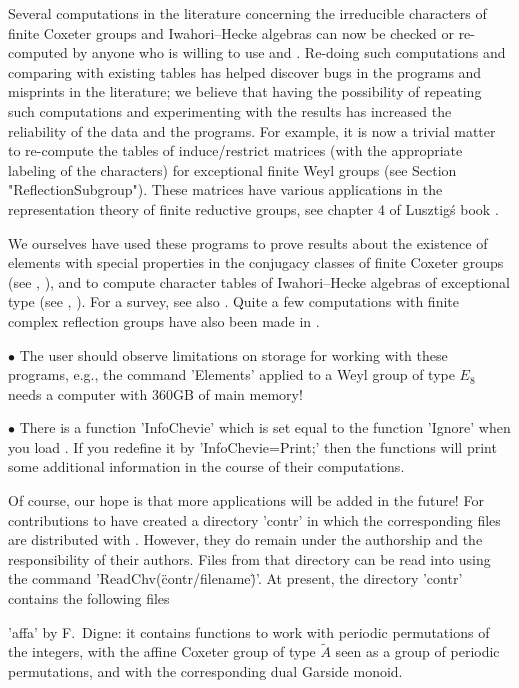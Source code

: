 Several   computations  in   the  literature   concerning  the  irreducible
characters  of finite Coxeter groups and Iwahori--Hecke algebras can now be
checked  or  re-computed  by  anyone  who  is  willing  to  use  {\GAP} and
\CHEVIE.  Re-doing such  computations and  comparing with existing tables
has  helped discover bugs in the  programs and misprints in the literature;
we  believe that having the possibility  of repeating such computations and
experimenting  with the results  has increased the  reliability of the data
and the programs. For example, it is now a trivial matter to re-compute the
tables  of induce/restrict matrices  (with the appropriate  labeling of the
characters) for exceptional finite Weyl groups (see Section
"ReflectionSubgroup").  These  matrices  have  various  applications in the
representation  theory  of  finite  reductive  groups,  see  chapter  4  of
Lusztig\'s book \cite{Lus85}.

We  ourselves have used these programs to prove results about the existence
of  elements with  special properties  in the  conjugacy classes  of finite
Coxeter  groups (see  \cite{GP93}, \cite{GM97}),  and to  compute character
tables  of Iwahori--Hecke  algebras of  exceptional type (see \cite{Gec94},
\cite{GM97}). For a survey, see also \cite{Chv96}. Quite a few computations
with finite complex reflection groups have also been made in \CHEVIE.

$\bullet$  The user should observe limitations  on storage for working with
these  programs, e.g.,  the command  'Elements' applied  to a Weyl group of
type $E_8$ needs a computer with 360GB of main memory!

$\bullet$ There is a function 'InfoChevie' which is set equal to the {\GAP}
function   'Ignore'  when  you   load  \CHEVIE.  If   you  redefine  it  by
'InfoChevie\:=Print;'   then  the  {\CHEVIE}   functions  will  print  some
additional information in the course of their computations.

Of  course, our hope is that more applications will be added in the future!
For  contributions to {\CHEVIE}  have created a  directory 'contr' in which
the  corresponding  files  are  distributed  with \CHEVIE. However, they do
remain  under the authorship and the responsibility of their authors. Files
from   that  directory   can  be   read  into   {\GAP}  using  the  command
'ReadChv(\"contr/filename\")'.  At present, the  directory 'contr' contains
the following files\:

'affa'   by  F.~Digne:  it   contains  functions  to   work  with  periodic
permutations of the integers, with the affine Coxeter group of type $\tilde
A$  seen as  a group  of periodic  permutations, and with the corresponding
dual Garside monoid.

